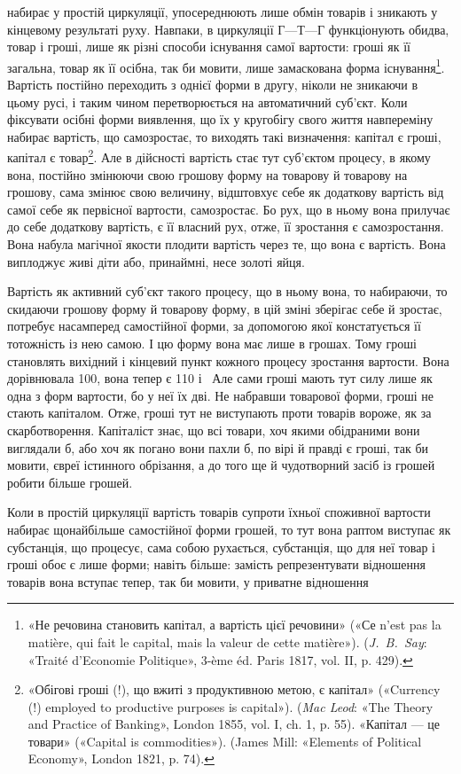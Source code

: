 \parcont{}  %
набирає у простій циркуляції, упосереднюють лише обмін товарів
і зникають у кінцевому результаті руху. Навпаки, в циркуляції
$Г — Т — Г$ функціонують обидва, товар і гроші, лише як різні
способи існування самої вартости: гроші як її загальна, товар
як її осібна, так би мовити, лише замаскована форма існування\footnote{
«Не речовина становить капітал, а вартість цієї речовини» («Се
n’est pas la matière, qui fait le capital, mais la valeur de cette matière»).
(\emph{J.~B.~Say}: «Traité d’Economie Politique», 3-ème éd. Paris 1817, vol. II,
p. 429).
}.
Вартість постійно переходить з однієї форми в другу, ніколи не
зникаючи в цьому русі, і таким чином перетворюється на автоматичний
суб’єкт. Коли фіксувати осібні форми виявлення, що
їх у кругобігу свого життя навпереміну набирає вартість, що
самозростає, то виходять такі визначення: капітал є гроші, капітал
є товар\footnote{
«Обігові гроші (!), що вжиті з продуктивною метою, є капітал»
(«Currency (!) employed to productive purposes is capital»). (\emph{Mac Leod}:
«The Theory and Practice of Banking», London 1855, vol. I, ch. 1, p. 55).
«Капітал — це товари» («Capital is commodities»). (James Mill: «Elements
of Political Economy», London 1821, p. 74).
}. Але в дійсності вартість стає тут суб’єктом процесу,
в якому вона, постійно змінюючи свою грошову форму на товарову
й товарову на грошову, сама змінює свою величину, відштовхує
себе як додаткову вартість від самої себе як первісної
вартости, самозростає. Бо рух, що в ньому вона прилучає до себе
додаткову вартість, є її власний рух, отже, її зростання є самозростання.
Вона набула магічної якости плодити вартість через
те, що вона є вартість. Вона виплоджує живі діти або, принаймні,
несе золоті яйця.

Вартість як активний суб’єкт такого процесу, що в ньому
вона, то набираючи, то скидаючи грошову форму й товарову
форму, в цій зміні зберігає себе й зростає, потребує насамперед
самостійної форми, за допомогою якої констатується її тотожність
із нею самою. І цю форму вона має лише в грошах. Тому гроші
становлять вихідний і кінцевий пункт кожного процесу зростання
вартости. Вона дорівнювала 100, вона тепер
є 110 і~ Але сами гроші мають тут силу
лише як одна з форм вартости, бо у неї їх дві. Не набравши товарової
форми, гроші не стають капіталом. Отже, гроші тут не виступають
проти товарів вороже, як за скарботворення. Капіталіст
знає, що всі товари, хоч якими обідраними вони виглядали б,
або хоч як погано вони пахли б, по вірі й правді є гроші, так би
мовити, євреї істинного обрізання, а до того ще й чудотворний
засіб із грошей робити більше грошей.

Коли в простій циркуляції вартість товарів супроти їхньої
споживної вартости набирає щонайбільше самостійної форми
грошей, то тут вона раптом виступає як субстанція, що процесує,
сама собою рухається, субстанція, що для неї товар і гроші обоє
є лише форми; навіть більше: замість репрезентувати відношення
товарів вона вступає тепер, так би мовити, у приватне відношення
\parbreak{}  %
